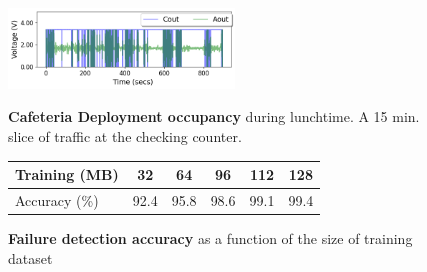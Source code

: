\begin{figure}
	\begin{minipage}[t]{0.48\textwidth}
		\includegraphics[width=6cm]{figures/deployment/bangalore-cafetria/msr-cafeteria-15mins.png}
		\vspace{-5pt}
		\caption{\textbf{Cafeteria Deployment occupancy} during lunchtime. A 15 min. slice of traffic at the checking counter.}
		\label{fig:deployment_msr_cafeteria}
	\end{minipage}
	\hfill
	\begin{minipage}{0.48\textwidth}
			\vspace{-\baselineskip}
				\begin{tabular}{l c c c c c}
					\hline
					\textbf{Training (MB)} & \textbf{32} & \textbf{64} & \textbf{96} & \textbf{112} & \textbf{128} \\
					\hline \hline
					Accuracy (\%) & 92.4 & 95.8 & 98.6 & 99.1 & 99.4 \\
					\hline
				\end{tabular}
			\vspace{\baselineskip}
			\caption{\textbf{Failure detection accuracy} as a function of the size of training dataset}
			\label{fig:dataset_size}
	\end{minipage}
\end{figure}%


